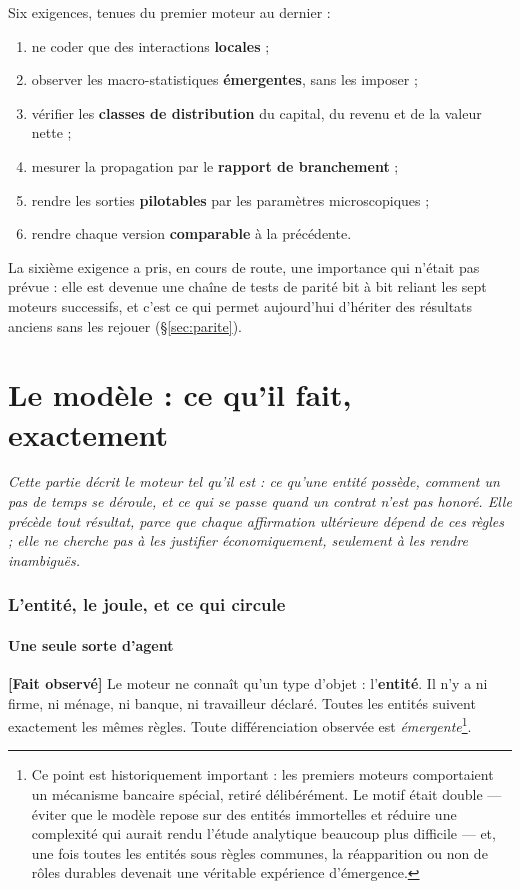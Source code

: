 \documentclass[11pt,a4paper]{article}
\newcommand{\fait}{\textbf{[Fait observé]}}
\begin{document}
Six exigences, tenues du premier moteur au dernier :

\begin{enumerate}
\item ne coder que des interactions \textbf{locales} ;
\item observer les macro-statistiques \textbf{émergentes}, sans les imposer ;
\item vérifier les \textbf{classes de distribution} du capital, du revenu et
      de la valeur nette ;
\item mesurer la propagation par le \textbf{rapport de branchement} ;
\item rendre les sorties \textbf{pilotables} par les paramètres microscopiques ;
\item rendre chaque version \textbf{comparable} à la précédente.
\end{enumerate}

La sixième exigence a pris, en cours de route, une importance qui n'était pas
prévue : elle est devenue une chaîne de tests de parité bit à bit reliant les
sept moteurs successifs, et c'est ce qui permet aujourd'hui d'hériter des
résultats anciens sans les rejouer (§\ref{sec:parite}).

\clearpage

\part{Le modèle : ce qu'il fait, exactement}

\emph{Cette partie décrit le moteur tel qu'il est : ce qu'une entité possède, comment
un pas de temps se déroule, et ce qui se passe quand un contrat n'est pas honoré.
Elle précède tout résultat, parce que chaque affirmation ultérieure dépend de ces
règles ; elle ne cherche pas à les justifier économiquement, seulement à les rendre
inambiguës.}

\section{L'entité, le joule, et ce qui circule}
\label{sec:modele}


\subsection{Une seule sorte d'agent}

\fait{} Le moteur ne connaît qu'un type d'objet : l'\textbf{entité}. Il n'y a
ni firme, ni ménage, ni banque, ni travailleur déclaré. Toutes les entités
suivent exactement les mêmes règles. Toute différenciation observée est
\emph{émergente}\footnote{Ce point est historiquement important : les premiers
moteurs comportaient un mécanisme bancaire spécial, retiré délibérément. Le
motif était double --- éviter que le modèle repose sur des entités immortelles
et réduire une complexité qui aurait rendu l'étude analytique beaucoup plus
difficile --- et, une fois toutes les entités sous règles communes, la
réapparition ou non de rôles durables devenait une véritable expérience
d'émergence.}.
\end{document}
